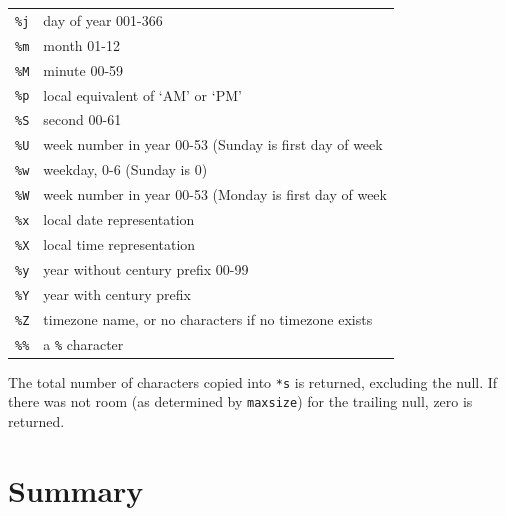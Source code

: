 \begin{description}
\begin{tabular}{lp{\textwidth}}
      \texttt{\%j} & day of year 001-366
     \\

      \texttt{\%m} & month 01-12
     \\

      \texttt{\%M} & minute 00-59
     \\

      \texttt{\%p} & local equivalent of `AM' or `PM'
     \\

      \texttt{\%S} & second 00-61
     \\

      \texttt{\%U} & week number in year 00-53
       (Sunday  is  first  day  of week
     \\

      \texttt{\%w} & weekday, 0-6 (Sunday is 0)
     \\

      \texttt{\%W} & week number in year 00-53
       (Monday  is  first  day  of week
     \\

      \texttt{\%x} & local date representation
     \\

      \texttt{\%X} & local time representation
     \\

      \texttt{\%y} & year without century prefix 00-99
     \\

      \texttt{\%Y} & year with century prefix
     \\

      \texttt{\%Z} & timezone name, or no characters if no timezone exists
     \\

      \texttt{\%\%} & a \texttt{\%} character
     \\
\end{tabular}


    The  total  number  of  characters  copied  into  \texttt{*s}   is
     returned,  excluding the null.  If there was not room (as determined by
     \texttt{maxsize}) for the  trailing  null,  zero  is returned.

   
  \end{description}

 
        \section{Summary}
        


